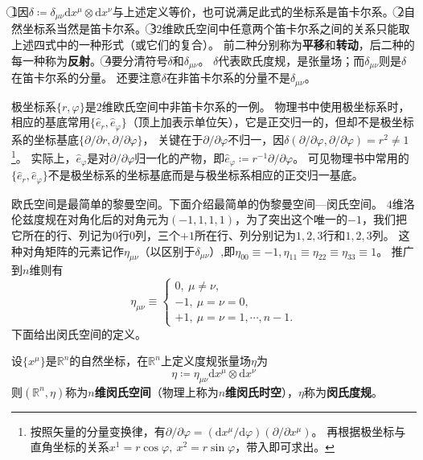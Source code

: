 \begin{note}
\textcircled{1}因$\delta \coloneq \delta_{\mu\nu}\mathrm{d}x^\mu\otimes\mathrm{d}x^\nu$与上述定义等价，也可说满足此式的坐标系是笛卡尔系。
\textcircled{2}自然坐标系当然是笛卡尔系。
\textcircled{3}$2$维欧氏空间中任意两个笛卡尔系之间的关系只能取上述四式中的一种形式（或它们的复合）。
前二种分别称为\textbf{平移}和\textbf{转动}，后二种的每一种称为\textbf{反射}。
\textcircled{4}要分清符号$\delta$和$\delta_{\mu\nu}$。
$\delta$代表欧氏度规，是张量场；而$\delta_{\mu\nu}$则是$\delta$在笛卡尔系的分量。
还要注意$\delta$在非笛卡尔系的分量不是$\delta_{\mu\nu}$。
\end{note}

极坐标系$\{r, \varphi\}$是$2$维欧氏空间中非笛卡尔系的一例。
物理书中使用极坐标系时，相应的基底常用$\{\hat{e}_r, \hat{e}_\varphi\}$（顶上加$\hat{}$表示单位矢），它是正交归一的，但却不是极坐标系的坐标基底$\{\partial / \partial r, \partial / \partial\varphi\}$，
关键在于$\partial / \partial\varphi$不归一，因$\delta(\partial / \partial\varphi, \partial / \partial\varphi) = r^2 \neq 1$\footnote{
按照矢量的分量变换律，有$\partial / \partial\varphi = (\mathrm{d}x^\mu / \mathrm{d}\varphi)(\partial / \partial x^\mu)$。
再根据极坐标与直角坐标的关系$x^1 = r\cos\varphi, ~ x^2 = r\sin\varphi$，带入即可求出。
}。
实际上，$\hat{e}_\varphi$是对$\partial / \partial\varphi$归一化的产物，即$\hat{e}_\varphi \coloneq r^{-1}\partial / \partial\varphi$。
可见物理书中常用的$\{\hat{e}_r, \hat{e}_\varphi\}$不是极坐标系的坐标基底而是与极坐标系相应的正交归一基底。

欧氏空间是最简单的黎曼空间。下面介绍最简单的伪黎曼空间---闵氏空间。
$4$维洛伦兹度规在对角化后的对角元为$(-1, 1, 1, 1)$，为了突出这个唯一的$-1$，我们把它所在的行、列记为$0$行$0$列，三个$+1$所在行、列分别记为$1, 2, 3$行和$1, 2, 3$列。
这种对角矩阵的元素记作$\eta_{\mu\nu}$（以区别于$\delta_{\mu\nu}$）,即$\eta_{00} \equiv -1, \eta_{11} \equiv \eta_{22} \equiv \eta_{33} \equiv 1$。
推广到$n$维则有
$$
\eta_{\mu\nu} \equiv
\begin{cases}
0, ~ \mu \neq \nu, \\
-1, ~ \mu = \nu = 0, \\
+1, ~ \mu = \nu = 1, \cdots, n -1.
\end{cases}
$$
下面给出闵氏空间的定义。

\begin{definition}
设$\{x^\mu\}$是$\mathbb{R}^n$的自然坐标，在$\mathbb{R}^n$上定义度规张量场$\eta$为
$$\eta \coloneq \eta_{\mu\nu}\mathrm{d}x^\mu\otimes\mathrm{d}x^\nu$$
则$(\mathbb{R}^n, \eta)$称为\textbf{$n$维闵氏空间}（物理上称为\textbf{$n$维闵氏时空}），$\eta$称为\textbf{闵氏度规}。
\end{definition}

